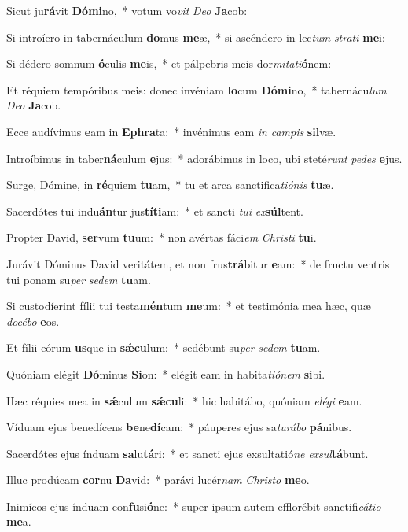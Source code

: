 \item Sicut ju\textbf{rá}vit \textbf{Dó}\textbf{mi}no,~* votum vo\textit{vit} \textit{De}\textit{o} \textbf{Ja}cob:
\item Si introíero in tabernáculum \textbf{do}mus \textbf{me}æ,~* si ascéndero in lec\textit{tum} \textit{stra}\textit{ti} \textbf{me}i:
\item Si dédero somnum \textbf{ó}culis \textbf{me}is,~* et pálpebris meis dor\textit{mi}\textit{ta}\textit{ti}\textbf{ó}nem:
\item Et réquiem tempóribus meis: donec invéniam \textbf{lo}cum \textbf{Dó}\textbf{mi}no,~* tabernácu\textit{lum} \textit{De}\textit{o} \textbf{Ja}cob.
\item Ecce audívimus \textbf{e}am in \textbf{E}\textbf{phra}ta:~* invénimus eam \textit{in} \textit{cam}\textit{pis} \textbf{sil}væ.
\item Introíbimus in taber\textbf{ná}culum \textbf{e}jus:~* adorábimus in loco, ubi steté\textit{runt} \textit{pe}\textit{des} \textbf{e}jus.
\item Surge, Dómine, in \textbf{ré}quiem \textbf{tu}am,~* tu et arca sanctifica\textit{ti}\textit{ó}\textit{nis} \textbf{tu}æ.
\item Sacerdótes tui indu\textbf{án}tur jus\textbf{tí}\textbf{ti}am:~* et sancti \textit{tu}\textit{i} \textit{ex}\textbf{súl}tent.
\item Propter David, \textbf{ser}vum \textbf{tu}um:~* non avértas fáci\textit{em} \textit{Chris}\textit{ti} \textbf{tu}i.
\item Jurávit Dóminus David veritátem, et non frus\textbf{trá}bitur \textbf{e}am:~* de fructu ventris tui ponam su\textit{per} \textit{se}\textit{dem} \textbf{tu}am.
\item Si custodíerint fílii tui testa\textbf{mén}tum \textbf{me}um:~* et testimónia mea hæc, quæ \textit{do}\textit{cé}\textit{bo} \textbf{e}os.
\item Et fílii eórum \textbf{us}que in \textbf{sǽ}\textbf{cu}lum:~* sedébunt su\textit{per} \textit{se}\textit{dem} \textbf{tu}am.
\item Quóniam elégit \textbf{Dó}minus \textbf{Si}on:~* elégit eam in habita\textit{ti}\textit{ó}\textit{nem} \textbf{si}bi.
\item Hæc réquies mea in \textbf{sǽ}culum \textbf{sǽ}\textbf{cu}li:~* hic habitábo, quóniam \textit{e}\textit{lé}\textit{gi} \textbf{e}am.
\item Víduam ejus benedícens \textbf{be}ne\textbf{dí}cam:~* páuperes ejus sa\textit{tu}\textit{rá}\textit{bo} \textbf{pá}nibus.
\item Sacerdótes ejus índuam \textbf{sa}lu\textbf{tá}ri:~* et sancti ejus exsultatió\textit{ne} \textit{ex}\textit{sul}\textbf{tá}bunt.
\item Illuc prodúcam \textbf{cor}nu \textbf{Da}vid:~* parávi lucér\textit{nam} \textit{Chris}\textit{to} \textbf{me}o.
\item Inimícos ejus índuam con\textbf{fu}si\textbf{ó}ne:~* super ipsum autem efflorébit sanctifi\textit{cá}\textit{ti}\textit{o} \textbf{me}a.
